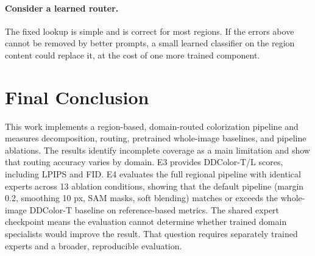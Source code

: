 \documentclass{FastFyp}
\begin{document}
\paragraph{Consider a learned router.} The fixed lookup is simple and is correct for most regions. If the errors above cannot be removed by better prompts, a small learned classifier on the region content could replace it, at the cost of one more trained component.


\section{Final Conclusion}
\label{sec:final-conclusion}
This work implements a region-based, domain-routed colorization pipeline and
measures decomposition, routing, pretrained whole-image baselines, and pipeline
ablations. The results identify incomplete coverage as a main limitation and
show that routing accuracy varies by domain. E3 provides DDColor-T/L scores,
including LPIPS and FID. E4 evaluates the full regional pipeline with
identical experts across 13 ablation conditions, showing that the default
pipeline (margin 0.2, smoothing 10 px, SAM masks, soft blending) matches or
exceeds the whole-image DDColor-T baseline on reference-based metrics. The
shared expert checkpoint means the evaluation cannot determine whether trained
domain specialists would improve the result. That question requires separately
trained experts and a broader, reproducible evaluation.
\end{document}
